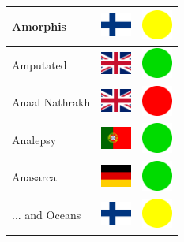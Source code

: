 \documentclass[12pt, a4paper, twoside]{report}
\begin{document}
\begin{center}
\begin{longtable}{|p{5cm}|p{2cm}|p{2cm}|}
 Amorphis                                                   & \includegraphics[width=1cm]{../img/flags/fi} &   \includegraphics[width=1cm]{../likes/m} \\ \hline
 Amputated                                                  & \includegraphics[width=1cm]{../img/flags/gb} &   \includegraphics[width=1cm]{../likes/y} \\ \hline
 Anaal Nathrakh                                             & \includegraphics[width=1cm]{../img/flags/gb} &   \includegraphics[width=1cm]{../likes/n} \\ \hline
 Analepsy                                                   & \includegraphics[width=1cm]{../img/flags/pt} &   \includegraphics[width=1cm]{../likes/y} \\ \hline
 Anasarca                                                   & \includegraphics[width=1cm]{../img/flags/de} &   \includegraphics[width=1cm]{../likes/y} \\ \hline
 ... and Oceans                                             & \includegraphics[width=1cm]{../img/flags/fi} &   \includegraphics[width=1cm]{../likes/m} \\ \hline

\end{longtable}
\end{center}
\end{document}
